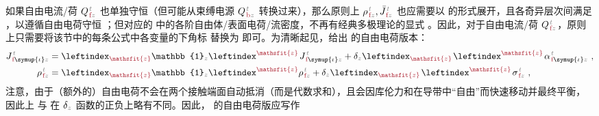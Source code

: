 如果自由电流/荷 ${Q}^{\;\!\mathcolor{gray}{t}}_{\;\!\textcolor{Maroon}{\text{f}}\mathcolor{gray}{z}}$ 也单独守恒（但可能从束缚电源 ${Q}^{\;\!\mathcolor{gray}{t}}_{\;\!\textcolor{Maroon}{\text{b}}\mathcolor{gray}{z}}$ 转换过来），那么原则上 ${\rho}^{\;\!\mathcolor{gray}{t}}_{\;\!\textcolor{Maroon}{\text{f}}\mathcolor{gray}{z}},\bar{J}^{\;\!\mathcolor{gray}{t}}_{\;\!\textcolor{Maroon}{\text{f}}\mathcolor{gray}{z}}$ 也应需要以  的形式展开，且各奇异层次间满足 ，以遵循自由电荷守恒 ；但对应的  中的各阶自由体/表面电荷/流密度，不再有经典多极理论的显式 。因此，对于自由电流/荷 ${Q}^{\;\!\mathcolor{gray}{t}}_{\;\!\textcolor{Maroon}{\text{f}}\mathcolor{gray}{z}}$，原则上只需要将该节中的每条公式中各变量的下角标 \textcolor{Maroon}{} 替换为 \textcolor{Maroon}{} 即可。为清晰起见，给出  的自由电荷版本：
\begin{subequations} \label{eq:e-f-01}
\begin{align}
	J^{\;\!\mathcolor{gray}{t}}_{\;\!\textcolor{Maroon}{\text{f}} \symup{\iota}\mathcolor{gray}{z}} &= \leftindex_{\textcolor{Maroon}{\mathsfit{z}}} {\mathbb{1}}_{\mathcolor{gray}{z}} \leftindex^{\textcolor{Maroon}{\mathsfit{z}}} \;\! J^{\;\!\mathcolor{gray}{t}}_{\;\!\textcolor{Maroon}{\text{f}} \symup{\iota}\mathcolor{gray}{z}} + \delta_{\mathcolor{gray}{z}} \leftindex_{\textcolor{Maroon}{\mathsfit{z}}} \;\! \leftindex^{\textcolor{Maroon}{\mathsfit{z}}} \;\!
	{\alpha}^{\;\!\mathcolor{gray}{t}}_{\;\!\textcolor{Maroon}{\text{f}} \symup{\iota}\mathcolor{gray}{z}} ~, \label{eq:j-f-01} \\
	{\rho}^{\;\!\mathcolor{gray}{t}}_{\;\!\textcolor{Maroon}{\text{f}}\mathcolor{gray}{z}} &= \leftindex_{\textcolor{Maroon}{\mathsfit{z}}} {\mathbb{1}}_{\mathcolor{gray}{z}} \leftindex^{\textcolor{Maroon}{\mathsfit{z}}} {\rho}^{\;\!\mathcolor{gray}{t}}_{\;\!\textcolor{Maroon}{\text{f}}\mathcolor{gray}{z}} + \delta_{\mathcolor{gray}{z}} \leftindex_{\textcolor{Maroon}{\mathsfit{z}}} \;\! \leftindex^{\textcolor{Maroon}{\mathsfit{z}}} \;\! {\sigma}^{\;\!\mathcolor{gray}{t}}_{\;\!\textcolor{Maroon}{\text{f}} \mathcolor{gray}{z}} ~, \label{eq:p-f-01}
\end{align}
\end{subequations}
注意，由于（额外的）自由电荷不会在两个接触端面自动抵消（而是代数求和），且会因库伦力和在导带中“自由”而快速移动并最终平衡，因此上  与  在 $\delta_{\mathcolor{gray}{z}}$ 函数的正负上略有不同。因此，  的自由电荷版应写作
